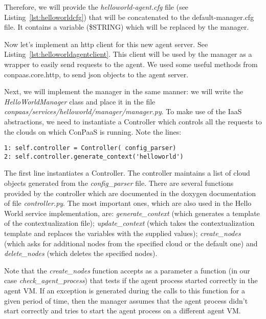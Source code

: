\documentclass[10pt]{article}
\newcommand{\ConPaaSHOME}{..}
\begin{document}
Therefore, we will provide the \textit{helloworld-agent.cfg} file (see Listing~\ref{lst:helloworldcfg}) that will be concatenated to the default-manager.cfg file. It contains a variable (\$STRING) which will be replaced by the manager.
 


Now let's implement an http client for this new agent server. See Listing~\ref{lst:helloworldagentclient}. This client will be used by the manager as a wrapper to easily send requests to the agent. We used some useful methods from conpaas.core.http, to send json objects to the agent server. 



Next, we will implement the manager in the same manner: we will write the \textit{HelloWorldManager} class and place it in the file \textit{conpaas/services/helloworld/manager/manager.py}. To make use of the IaaS abstractions, we need to instantiate a Controller which controls all the requests to the clouds on which ConPaaS is running. Note the lines: 

\begin{lstlisting}
1: self.controller = Controller( config_parser)
2: self.controller.generate_context('helloworld')
\end{lstlisting}

The first line instantiates a Controller. The controller maintains a list of cloud objects generated from the \textit{config\_parser} file. There are several functions provided by the controller which are documented in the doxygen documentation of file \textit{controller.py}. The most important ones, which are also used in the Hello World service implementation, are: \textit{generate\_context} (which generates a template of the contextualization file); \textit{update\_context} (which takes the contextualization template and replaces the variables with the supplied values); \textit{create\_nodes} (which asks for additional nodes from the specified cloud or the default one) and \textit{delete\_nodes} (which deletes the specified nodes).

Note that the \textit{create\_nodes} function accepts as a parameter a function (in our case \textit{check\_agent\_process}) that tests if the agent process started correctly in the agent VM. If an exception is generated during the calls to this function for a given period of time, then the manager assumes that the agent process didn't start correctly and tries to start the agent process on a different agent VM.   
\end{document}
